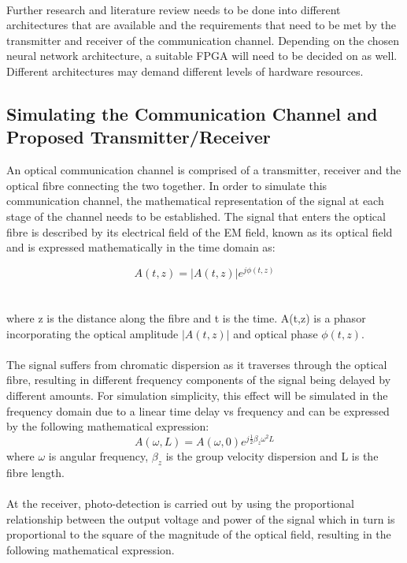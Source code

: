 \\
Further research and literature review needs to be done into different architectures that are available and the requirements that need to be met by the transmitter and receiver of the communication channel. Depending on the chosen neural network architecture, a suitable FPGA will need to be decided on as well. Different architectures may demand different levels of hardware resources.

\subsection{Simulating the Communication Channel and Proposed Transmitter/Receiver}

An optical communication channel is comprised of a transmitter, receiver and the optical fibre connecting the two together. In order to simulate this communication channel, the mathematical representation of the signal at each stage of the channel needs to be established. The signal that enters the optical fibre is described by its electrical field of the EM field, known as its optical field and is expressed mathematically in the time domain as: 

\begin{equation}
    A(t, z) = |A(t,z)|e^{j\phi(t,z)}
\end{equation}
\\
\\
where z is the distance along the fibre and t is the time. A(t,z) is a phasor incorporating the optical amplitude $|A(t,z)|$ and optical phase $\phi(t,z)$. 
\\
\\
The signal suffers from chromatic dispersion as it traverses through the optical fibre, resulting in different frequency components of the signal being delayed by different amounts. For simulation simplicity, this effect will be simulated in the frequency domain due to a linear time delay vs frequency and can be expressed by the following mathematical expression:
\begin{equation}\label{opticalField}
    A(\omega,L) = A(\omega,0)e^{j\frac{1}{2}\beta_z\omega^2L}
\end{equation}
where $\omega$ is angular frequency, $\beta_z$ is the group velocity dispersion and L is the fibre length.
\\
\\
At the receiver, photo-detection is carried out by using the proportional relationship between the output voltage and power of the signal which in turn is proportional to the square of the magnitude of the optical field, resulting in the following mathematical expression.

